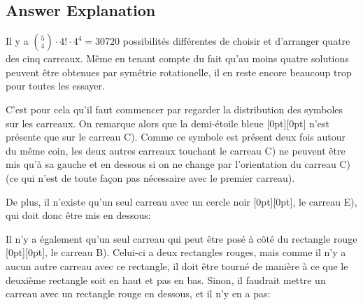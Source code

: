 \documentclass[a4paper,11pt]{report}
\newcommand{\taskGraphicsFolder}{..}
\begin{document}
\endgroup

\subsection*{Answer Explanation}

Il y a ${{5 \choose 4}  \cdot 4! \cdot 4^4 = 30720}$ possibilités différentes de choisir et d’arranger quatre des cinq carreaux. Même en tenant compte du fait qu’au moins quatre solutions peuvent être obtenues par symétrie rotationelle, il en reste encore beaucoup trop pour toutes les essayer.

C’est pour cela qu’il faut commencer par regarder la distribution des symboles sur les carreaux. On remarque alors que la demi-étoile bleue \raisebox{\dimexpr -0.5ex +0.4ex \relax}[0pt][0pt]{} n’est présente que sur le carreau C). Comme ce symbole est présent deux fois autour du même coin, les deux autres carreaux touchant le carreau C) ne peuvent être mis qu’à sa gauche et en dessous si on ne change par l’orientation du carreau C) (ce qui n’est de toute façon pas nécessaire avec le premier carreau).

{\centering%
\par}

De plus, il n’existe qu’un seul carreau avec un cercle noir \raisebox{\dimexpr -0.5ex +0.4ex \relax}[0pt][0pt]{}, le carreau E), qui doit donc être mis en dessous:

{\centering%
\par}

Il n’y a également qu’un seul carreau qui peut être posé à côté du rectangle rouge \raisebox{\dimexpr -0.5ex +0.4ex \relax}[0pt][0pt]{}, le carreau B). Celui-ci a deux rectangles rouges, mais comme il n’y a aucun autre carreau avec ce rectangle, il doit être tourné de manière à ce que le deuxième rectangle soit en haut et pas en bas. Sinon, il faudrait mettre un carreau avec un rectangle rouge en dessous, et il n’y en a pas:

{\centering%
\par}
\end{document}
